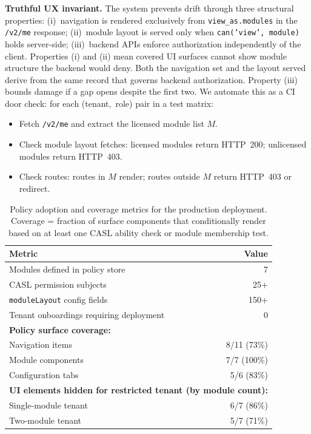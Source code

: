 \documentclass[10pt,journal]{IEEEtran}
\newcommand{\code}[1]{{\small\textcolor{CausifyBlue}{\texttt{#1}}}}
\begin{document}
\noindent\textbf{Truthful UX invariant.} The system prevents drift through three
structural properties: (i)~navigation is rendered exclusively from
\code{view\_as.modules} in the \code{/v2/me} response; (ii)~module layout
is served only when \code{can('view',\,module)} holds server-side;
(iii)~backend APIs enforce authorization independently of the client.
Properties (i) and (ii) mean covered UI surfaces cannot show module
structure the backend would deny. Both the navigation set and the layout
served derive from the same record that governs backend authorization.
Property (iii) bounds damage if a gap opens despite the
first two.
We automate this as a CI door check: for each (tenant,~role) pair in a
test matrix:
\begin{itemize}[label=\textbullet, leftmargin=1.2em, topsep=3pt, itemsep=1pt, parsep=0pt, partopsep=0pt]
  \item Fetch \code{/v2/me} and extract the licensed module list $M$.
  \item Check module layout fetches: licensed modules return HTTP~200; unlicensed
    modules return HTTP~403.
  \item Check routes: routes in $M$ render; routes outside $M$ return HTTP~403 or
    redirect.
\end{itemize}

\begin{table}[h!]
  \centering
  \caption{Policy adoption and coverage metrics for the production deployment.
  Coverage = fraction of surface components that conditionally render based on
  at least one CASL ability check or module membership test.}
  \label{tab:eval_summary}
  \small
  \begin{tabularx}{\columnwidth}{X r}
    \toprule
    \textbf{Metric} & \textbf{Value} \\
    \midrule
    Modules defined in policy store         & 7 \\
    CASL permission subjects                & 25+ \\
    \code{moduleLayout} config fields       & 150+ \\
    Tenant onboardings requiring deployment & 0 \\
    \midrule
    \textbf{Policy surface coverage:}       & \\
    Navigation items                        & 8/11 (73\%) \\
    Module components                       & 7/7 (100\%) \\
    Configuration tabs                      & 5/6 (83\%) \\
    \midrule
    \multicolumn{2}{l}{\textbf{UI elements hidden for restricted tenant (by module count):}} \\
    Single-module tenant                    & 6/7 (86\%) \\
    Two-module tenant                       & 5/7 (71\%) \\
    \bottomrule
  \end{tabularx}
\end{table}
\end{document}
